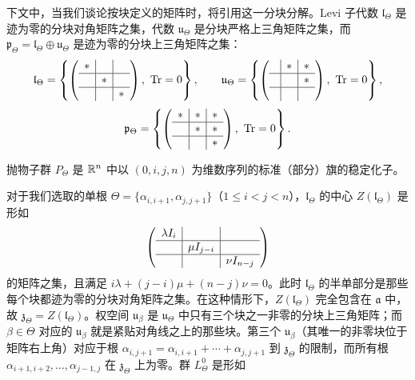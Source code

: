 
下文中，当我们谈论按块定义的矩阵时，将引用这一分块分解。Levi 子代数 $\mathfrak{l}_\Theta$ 是迹为零的分块对角矩阵之集，代数 $\mathfrak{u}_\Theta$ 是分块严格上三角矩阵之集，而 $\mathfrak{p}_\Theta=\mathfrak{l}_\Theta\oplus\mathfrak{u}_\Theta$ 是迹为零的分块上三角矩阵之集：
\[
\mathfrak{l}_\Theta=\left\{\left(
\begin{array}{c|c|c}
\ast & & \\ \hline
 & \ast & \\ \hline
 & & \ast
\end{array}
\right),\ \operatorname{Tr}=0\right\},\qquad
\mathfrak{u}_\Theta=\left\{\left(
\begin{array}{c|c|c}
 & \ast & \ast\\ \hline
 & & \ast\\ \hline
 & &
\end{array}
\right),\ \operatorname{Tr}=0\right\},
\]
\[
\mathfrak{p}_\Theta=\left\{\left(
\begin{array}{c|c|c}
\ast & \ast & \ast\\ \hline
 & \ast & \ast\\ \hline
 & & \ast
\end{array}
\right),\ \operatorname{Tr}=0\right\}.
\]

抛物子群 $P_\Theta$ 是 $\mathbb{R}^n$ 中以 $(0,i,j,n)$ 为维数序列的标准（部分）旗的稳定化子。

对于我们选取的单根 $\Theta=\{\alpha_{i,i+1},\alpha_{j,j+1}\}$（$1\le i<j<n$），$\mathfrak{l}_\Theta$ 的中心 $Z(\mathfrak{l}_\Theta)$ 是形如
\[
\left(
\begin{array}{c|c|c}
\lambda I_i & & \\ \hline
 & \mu I_{j-i} & \\ \hline
 & & \nu I_{n-j}
\end{array}
\right)
\]
的矩阵之集，且满足 $i\lambda+(j-i)\mu+(n-j)\nu=0$。此时 $\mathfrak{l}_\Theta$ 的半单部分是那些每个块都迹为零的分块对角矩阵之集。在这种情形下，$Z(\mathfrak{l}_\Theta)$ 完全包含在 $\mathfrak{a}$ 中，故 $\mathfrak{z}_\Theta=Z(\mathfrak{l}_\Theta)$。权空间 $\mathfrak{u}_\beta$ 是 $\mathfrak{u}_\Theta$ 中只有三个块之一非零的分块上三角矩阵；而 $\beta\in\Theta$ 对应的 $\mathfrak{u}_\beta$ 就是紧贴对角线之上的那些块。第三个 $\mathfrak{u}_\beta$（其唯一的非零块位于矩阵右上角）对应于根 $\alpha_{i,j+1}=\alpha_{i,i+1}+\cdots+\alpha_{j,j+1}$ 到 $\mathfrak{z}_\Theta$ 的限制，而所有根 $\alpha_{i+1,i+2},\dots,\alpha_{j-1,j}$ 在 $\mathfrak{z}_\Theta$ 上为零。群 $L_\Theta^0$ 是形如

